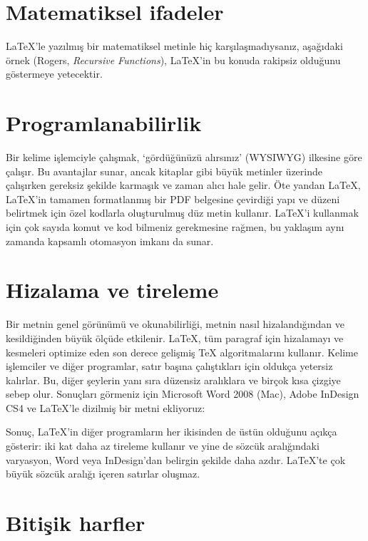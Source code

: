 \documentclass[
  10pt,
]{scrbook}
\begin{document}
\hypertarget{matematiksel-ifadeler}{%
\section{Matematiksel ifadeler}\label{matematiksel-ifadeler}}

LaTeX'le yazılmış bir matematiksel metinle hiç karşılaşmadıysanız,
aşağıdaki örnek (Rogers, \emph{Recursive Functions}), LaTeX'in bu konuda
rakipsiz olduğunu göstermeye yetecektir.

\hypertarget{programlanabilirlik}{%
\section{Programlanabilirlik}\label{programlanabilirlik}}

Bir kelime işlemciyle çalışmak, `gördüğünüzü alırsınız' (WYSIWYG)
ilkesine göre çalışır. Bu avantajlar sunar, ancak kitaplar gibi büyük
metinler üzerinde çalışırken gereksiz şekilde karmaşık ve zaman alıcı
hale gelir. Öte yandan LaTeX, LaTeX'in tamamen formatlanmış bir PDF
belgesine çevirdiği yapı ve düzeni belirtmek için özel kodlarla
oluşturulmuş düz metin kullanır. LaTeX'i kullanmak için çok sayıda komut
ve kod bilmeniz gerekmesine rağmen, bu yaklaşım aynı zamanda kapsamlı
otomasyon imkanı da sunar.

\hypertarget{hizalama-ve-tireleme}{%
\section{Hizalama ve tireleme}\label{hizalama-ve-tireleme}}

Bir metnin genel görünümü ve okunabilirliği, metnin nasıl
hizalandığından ve kesildiğinden büyük ölçüde etkilenir. LaTeX, tüm
paragraf için hizalamayı ve kesmeleri optimize eden son derece gelişmiş
TeX algoritmalarını kullanır. Kelime işlemciler ve diğer programlar,
satır başına çalıştıkları için oldukça yetersiz kalırlar. Bu, diğer
şeylerin yanı sıra düzensiz aralıklara ve birçok kısa çizgiye sebep
olur. Sonuçları görmeniz için Microsoft Word 2008 (Mac), Adobe InDesign
CS4 ve LaTeX'le dizilmiş bir metni ekliyoruz:

Sonuç, LaTeX'in diğer programların her ikisinden de üstün olduğunu
açıkça gösterir: iki kat daha az tireleme kullanır ve yine de sözcük
aralığındaki varyasyon, Word veya InDesign'dan belirgin şekilde daha
azdır. LaTeX'te çok büyük sözcük aralığı içeren satırlar oluşmaz.

\hypertarget{bitiux15fik-harfler}{%
\section{Bitişik harfler}\label{bitiux15fik-harfler}}
\end{document}
